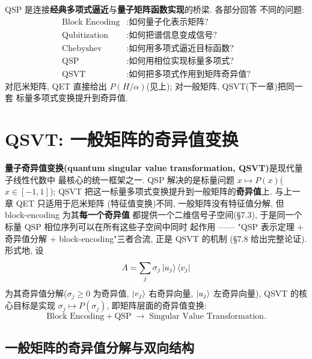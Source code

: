 \documentclass[utf8]{article} %
\numberwithin{equation}{section}   %
\newtheorem{Note}{\hskip 2em {\color{red} 注}}[subsection]
\begin{document}
\begin{Note}[完整知识链]
    QSP 是连接\textbf{经典多项式逼近}与\textbf{量子矩阵函数实现}的桥梁. 各部分回答
    不同的问题:
    \begin{equation}
        \begin{aligned}
            \text{Block Encoding} &: \text{如何量子化表示矩阵?}\\
            \text{Qubitization} &: \text{如何把谱信息变成信号?}\\
            \text{Chebyshev} &: \text{如何用多项式逼近目标函数?}\\
            \text{QSP} &: \text{如何用相位实现标量多项式?}\\
            \text{QSVT} &: \text{如何把多项式作用到矩阵奇异值?}
        \end{aligned}
    \end{equation}
    对厄米矩阵, QET 直接给出 $P(H/\alpha)$(见上); 对一般矩阵, QSVT(下一章)把同一套
    标量多项式变换提升到奇异值.
\end{Note}

\section{QSVT: 一般矩阵的奇异值变换}

\textbf{量子奇异值变换(quantum singular value transformation, QSVT)}是现代量子线性代数中
最核心的统一框架之一. QSP 解决的是标量问题 $x \mapsto P(x)$($x \in [-1,1]$);
QSVT 把这一标量多项式变换提升到一般矩阵的\textbf{奇异值}上. 与上一章 QET 只适用于厄米矩阵
(特征值变换)不同, 一般矩阵没有特征值分解, 但 block-encoding 为其\textbf{每一个奇异值}
都提供一个二维信号子空间(§7.3), 于是同一个标量 QSP 相位序列可以在所有这些子空间中同时
起作用 —— "QSP 表示定理 + 奇异值分解 + block-encoding"三者合流, 正是 QSVT 的机制
(§7.8 给出完整论证). 形式地, 设
\begin{equation}
    A = \sum_j \sigma_j \ket{u_j}\bra{v_j}
\end{equation}
为其奇异值分解($\sigma_j \ge 0$ 为奇异值, $\ket{v_j}$ 右奇异向量, $\ket{u_j}$ 左奇异向量),
QSVT 的核心目标是实现 $\sigma_j \mapsto P(\sigma_j)$, 即矩阵层面的奇异值变换:
\begin{equation}
    \text{Block Encoding} + \text{QSP} \;\longrightarrow\; \text{Singular Value Transformation}.
\end{equation}

\subsection{一般矩阵的奇异值分解与双向结构}
\end{document}
